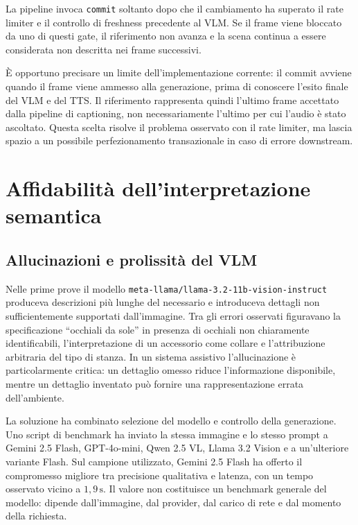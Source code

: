 La pipeline invoca \texttt{commit} soltanto dopo che il cambiamento ha
superato il rate limiter e il controllo di freshness precedente al VLM. Se il
frame viene bloccato da uno di questi gate, il riferimento non avanza e la
scena continua a essere considerata non descritta nei frame successivi.

È opportuno precisare un limite dell'implementazione corrente: il commit
avviene quando il frame viene ammesso alla generazione, prima di conoscere
l'esito finale del VLM e del TTS. Il riferimento rappresenta quindi l'ultimo
frame accettato dalla pipeline di captioning, non necessariamente l'ultimo per
cui l'audio è stato ascoltato. Questa scelta risolve il problema osservato con
il rate limiter, ma lascia spazio a un possibile perfezionamento transazionale
in caso di errore downstream.

\section{Affidabilità dell'interpretazione semantica}
\label{sec:problemi-semantica}

\subsection{Allucinazioni e prolissità del VLM}
\label{subsec:problemi-vlm}

Nelle prime prove il modello
\texttt{meta-llama/llama-3.2-11b-vision-instruct} produceva descrizioni più
lunghe del necessario e introduceva dettagli non sufficientemente supportati
dall'immagine. Tra gli errori osservati figuravano la specificazione
``occhiali da sole'' in presenza di occhiali non chiaramente identificabili,
l'interpretazione di un accessorio come collare e l'attribuzione arbitraria
del tipo di stanza. In un sistema assistivo l'allucinazione è particolarmente
critica: un dettaglio omesso riduce l'informazione disponibile, mentre un
dettaglio inventato può fornire una rappresentazione errata dell'ambiente.

La soluzione ha combinato selezione del modello e controllo della generazione.
Uno script di benchmark ha inviato la stessa immagine e lo stesso prompt a
Gemini 2.5 Flash, GPT-4o-mini, Qwen 2.5 VL, Llama 3.2 Vision e a un'ulteriore
variante Flash. Sul campione utilizzato, Gemini 2.5 Flash ha offerto il
compromesso migliore tra precisione qualitativa e latenza, con un tempo
osservato vicino a \(1{,}9\,\mathrm{s}\). Il valore non costituisce un
benchmark generale del modello: dipende dall'immagine, dal provider, dal
carico di rete e dal momento della richiesta.

